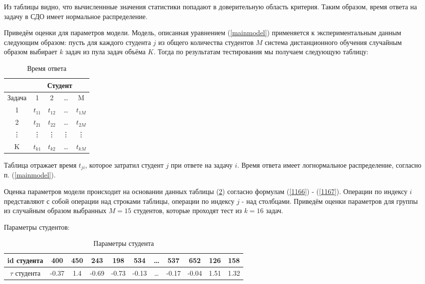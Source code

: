 Из таблицы видно, что вычисленнные значения статистики попадают в доверительную область критерия. Таким образом, время ответа на задачу в СДО имеет нормальное распределение.

Приведём оценки для параметров модели. Модель, описанная уравнением (\ref{mainmodel}) применяется к экспериментальным данным следующим образом: пусть для каждого студента $j$ из общего количества студентов $M$ система дистан\-ционного обучения случайным образом выбирает $k$ задач из пула задач объ\-ёма $K$. Тогда по результатам тестирования мы получаем следующую таблицу:
\begin{table}[H]
\caption{Время ответа}
\label{tabular:IRTtable}
\begin{center}
\begin{tabular}{|c|c|c|c|c|}
\hline
 & \multicolumn{4}{|c|}{Студент}\\
 \hline
 Задача & 1 & 2 & \dots & M \\
 \hline
 1 & $t_{11}$ & $t_{12}$ & \dots & $t_{1M}$\\
\hline
 2 & $t_{21}$ & $t_{22}$ & \dots & $t_{2M}$\\
\hline
 \vdots & \vdots & \vdots & \vdots & \vdots\\
\hline
 K & $t_{k1}$ & $t_{k2}$ & \dots & $t_{kM}$\\
\hline
\end{tabular}
\end{center}
\end{table}

Таблица отражает время $t_{ji}$, которое затратил студент  $j$ при ответе на задачу $i$. Время ответа имеет логнормальное распределение, согласно п. (\ref{mainmodel}).

Оценка параметров модели происходит на основании данных таблицы (\ref{tabular:IRTtable}) согласно формулам (\ref{1166}) - (\ref{1167}). Операции по индексу $i$ представляют с собой операции над строками таблицы, операции по индексу $j$ -  над столбцами. Приведём оценки параметров для группы из случайным образом выбранных $M=15$ студентов, которые проходят тест из $k=16$ задач.

Параметры студентов:
\begin{table}[H]
\caption{Параметры студента}
\label{tabular:IRTtable}
\begin{center}
\begin{tabular}
{|c	|c	|c	|c	|c	|c	|c	|c	|c	|c	|c|}
\hline
id студента  		&	400			&	450		&	243		&	198			&	534			&	\ldots			&	537		&	652		&	126		&	158	\\ 
\hline
$\tau$ студента		&	-0.37		&	1.4		&	-0.69	&	-0.73		&	-0.13		&	\ldots		&	-0.17		&	-0.04		&	1.51		&	1.32	\\
\hline
\end{tabular}
\end{center}
\end{table}

